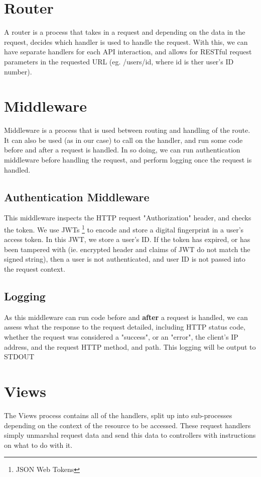 \documentclass[a4paper,11pt]{report}
\begin{document}
\section{Router}
A router is a process that takes in a request and depending on the data in the
request, decides which handler is used to handle the request. With this, we can
have separate handlers for each API interaction, and allows for RESTful request
parameters in the requested URL (eg. /users/{id}, where id is ther user's ID
number).

\section{Middleware}
Middleware is a process that is used between routing and handling of the route.
It can also be used (as in our case) to call on the handler, and run some code
before and after a request is handled. In so doing, we can run authentication
middleware before handling the request, and perform logging once the request is
handled.

\subsection{Authentication Middleware}
This middleware inspects the HTTP request "Authorization" header, and checks the
token. We use JWTs \footnote[1]{JSON Web Tokens} to encode and store a digital
fingerprint in a user's access token. In this JWT, we store a user's ID. If the
token has expired, or has been tampered with (ie. encrypted header and claims of
JWT do not match the signed string), then a user is not authenticated, and user
ID is not passed into the request context.

\subsection{Logging}
As this middleware can run code before and \textbf{after} a request is handled,
we can assess what the response to the request detailed, including HTTP status
code, whether the request was considered a "success", or an "error", the
client's IP address, and the request HTTP method, and path. This logging will be
output to STDOUT

\section{Views}
The Views process contains all of the handlers, split up into sub-processes
depending on the context of the resource to be accessed. These request handlers
simply unmarshal request data and send this data to controllers with
instructions on what to do with it.
\end{document}
